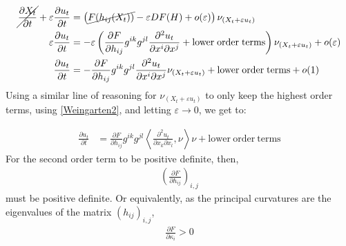 \begin{align*}
	\cancel{\frac{\partial X_t}{\partial t}} + \varepsilon\frac{\partial u_t}{\partial t}  &= \left(\cancel{F(h_{ij}(X_t)) }
	- \varepsilon DF (H) + o(\varepsilon)\right)\nu_{(X_t+\varepsilon u_t)}\\
	\varepsilon\frac{\partial u_t}{\partial t}  &= - \varepsilon\left(
	\frac{\partial F}{\partial h_{i j}} g^{i k}g^{jl}\frac{\partial^2 u_t}{\partial x^i \partial x^j}  + \mathrm{lower \; order \;  terms}\right)\nu_{(X_t+\varepsilon u_t)} + o(\varepsilon)\\
	\frac{\partial u_t}{\partial t}  &= 
	- \frac{\partial F}{\partial h_{i j}} g^{i k}g^{jl}\frac{\partial^2 u_t}{\partial x^i \partial x^j} \nu_{(X_t+\varepsilon u_t)} + \mathrm{lower \; order \;  terms} + o(1)
\end{align*}
Using a similar line of reasoning for $\nu_{(X_t+\varepsilon u_t)}$ to only keep the highest order terms, using \ref{Weingarten2},  and letting $\varepsilon\rightarrow 0$, we get to: 

%
\begin{align*}
	\frac{\partial u_t}{\partial t} &= \frac{\partial F}{\partial h_{i j}} g^{i k}g^{jl}\left\langle \frac{\partial^2 u_t}{\partial x_k\partial x_l} , \nu \right\rangle \nu+ \mathrm{lower \ order \ terms}
\end{align*}
For the second order term to be positive definite, then, 
\begin{align*}
	\left(\frac{\partial F}{\partial h_{i j}} \right)_{i, j}
\end{align*}
must be positive definite. Or equivalently, as the principal curvatures are the eigenvalues of the matrix $(h_{i j})_{i, j}$,
\begin{align*}
	\frac{\partial F}{\partial \kappa_{i}} > 0
\end{align*}

